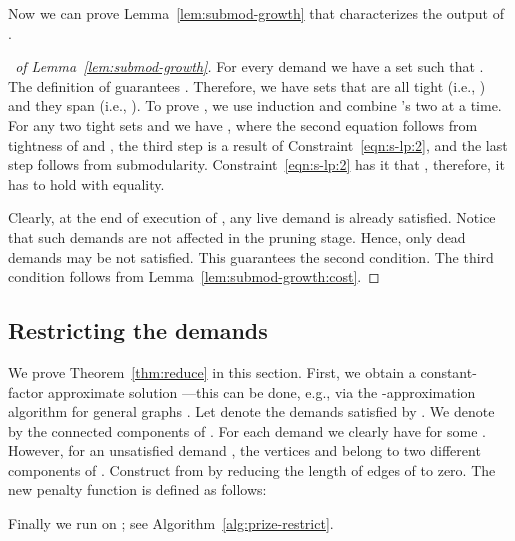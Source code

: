Now we can prove Lemma~\ref{lem:submod-growth}
that characterizes the output of .

\begin{proof}[\proofname\ of Lemma~\ref{lem:submod-growth}]
For every demand  we have a set 
such that .  The definition of  guarantees
.  Therefore, we have sets 
that are all tight (i.e., ) and they span 
(i.e., ).
To prove , we use induction
and combine 's two at a time.
For any two tight sets  and  we have
,
where the second equation follows from tightness of  and ,
the third step is a result of Constraint~\eqref{eqn:s-lp:2},
and the last step follows from submodularity.
Constraint~\eqref{eqn:s-lp:2} has it that ,
therefore, it has to hold with equality.

Clearly, at the end of execution of ,
any live demand is already satisfied.  Notice that such demands are not
affected in the pruning stage.  Hence, only dead demands may be not satisfied.
This guarantees the second condition.  The third condition follows from
Lemma~\ref{lem:submod-growth:cost}.
\end{proof}






\subsection{Restricting the demands}\label{sec:reduce:1}\label{sec:rest-prize}

We prove Theorem~\ref{thm:reduce} in this section.
First, we obtain a constant-factor approximate solution ---this can be done, e.g., via the -approximation algorithm for general graphs \cite{HKKN10}.
Let  denote the demands satisfied by .
 We denote by  the connected components of .
 For each demand  we clearly have 
for some .  However, for an unsatisfied demand ,
the vertices  and  belong to  two different components of .
Construct  from  by reducing the length of edges of  to zero.
The new penalty function  is defined as follows:

 Finally we run  on ; see Algorithm~\ref{alg:prize-restrict}. 















